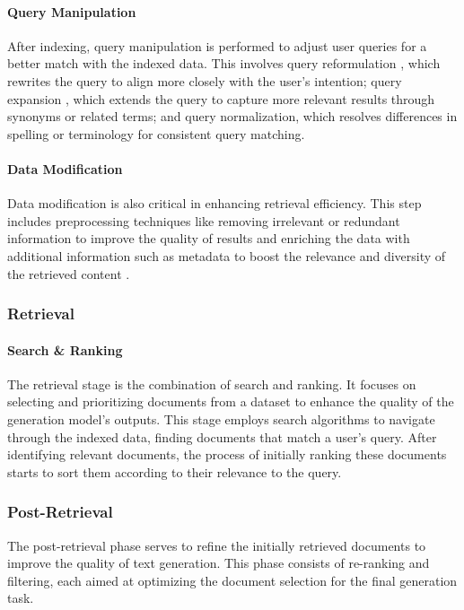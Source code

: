 \paragraph{Query Manipulation} After indexing, query manipulation is performed to adjust user queries for a better match with the indexed data. This involves query reformulation \cite{DBLP:journals/jasis/JansenBS09, DBLP:conf/sigir/YuLYXBG020}, which rewrites the query to align more closely with the user's intention; query expansion \cite{DBLP:journals/ipm/HuangMH13}, which extends the query to capture more relevant results through synonyms or related terms; and query normalization, which resolves differences in spelling or terminology for consistent query matching.

\paragraph{Data Modification} Data modification is also critical in enhancing retrieval efficiency. This step includes preprocessing techniques like removing irrelevant or redundant information to improve the quality of results and enriching the data with additional information such as metadata to boost the relevance and diversity of the retrieved content \cite{DBLP:conf/nips/BevilacquaOLY0P22}.

\subsubsection{Retrieval}
\paragraph{Search \& Ranking} The retrieval stage is the combination of search and ranking. It focuses on selecting and prioritizing documents from a dataset to enhance the quality of the generation model's outputs. This stage employs search algorithms to navigate through the indexed data, finding documents that match a user's query.  After identifying relevant documents, the process of initially ranking these documents starts to sort them according to their relevance to the query. 

\subsubsection{Post-Retrieval}
The post-retrieval phase serves to refine the initially retrieved documents to improve the quality of text generation. This phase consists of re-ranking and filtering, each aimed at optimizing the document selection for the final generation task.

